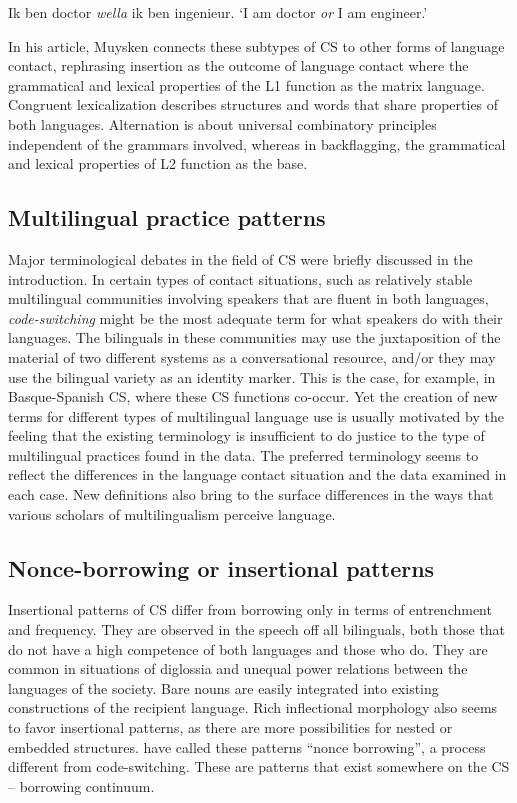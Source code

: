 \documentclass[output=paper]{langscibook}
\begin{document}
\begin{exe}
\ex \label{backflagging}
Ik ben doctor \textit{wella} ik ben ingenieur.
\glt `I am doctor \textit{or} I am engineer.'
\end{exe}

In his \citeyear{muysken2013language} article, Muysken connects these subtypes of CS to other forms of language contact, rephrasing insertion as the outcome of language contact where the grammatical and lexical properties of the L1 function as the matrix language. Congruent lexicalization describes structures and words that share properties of both languages. Alternation is about universal combinatory principles independent of the grammars involved, whereas in backflagging, the grammatical and lexical properties of L2 function as the base.

\subsection{Multilingual practice patterns}
Major terminological debates in the field of CS were briefly discussed in the introduction. In certain types of contact situations, such as relatively stable multilingual communities involving speakers that are fluent in both languages, \textit{code-switching} might be the most adequate term for what speakers do with their languages. The bilinguals in these communities may use the juxtaposition of the material of two different systems as a conversational resource, and/or they may use the bilingual variety as an identity marker. This is the case, for example, in Basque-Spanish CS, where these CS functions co-occur. Yet the creation of new terms for different types of multilingual language use is usually motivated by the feeling that the existing terminology is insufficient to do justice to the type of multilingual practices found in the data. The preferred terminology seems to reflect the differences in the language contact situation and the data examined in each case. New definitions also bring to the surface differences in the ways that various scholars of multilingualism perceive language.

\subsection{Nonce-borrowing or insertional patterns}
Insertional patterns of CS differ from borrowing only in terms of entrenchment and frequency. They are observed in the speech off all bilinguals, both those that do not have a high competence of both languages and those who do. They are common in situations of diglossia and unequal power relations between the languages of the society. Bare nouns are easily integrated into existing constructions of the recipient language. Rich inflectional morphology also seems to favor insertional patterns, as there are more possibilities for nested or embedded structures. \textcite{poplack1998introduction} have called these patterns “nonce borrowing”, a process different from code-switching. These are patterns that exist somewhere on the CS – borrowing continuum.
\end{document}
